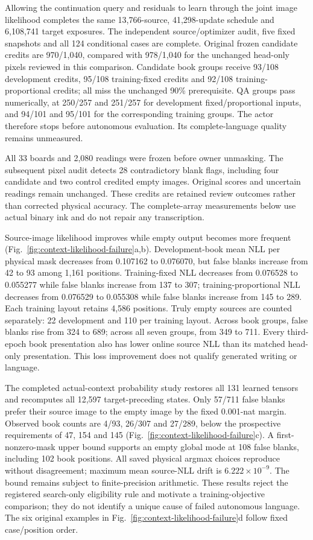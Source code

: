 \documentclass[12pt,a4paper]{article}
\providecommand{\DIFadd}[1]{{\protect\color{blue} \sf #1}} %
\begin{document}
\DIFadd{Allowing the continuation query and residuals to learn through the joint image
likelihood completes the same 13,766-source, 41,298-update schedule and
6,108,741 target exposures. The independent source/optimizer audit, five fixed
snapshots and all 124 conditional cases are complete. Original frozen candidate
credits are 970/1,040, compared with 978/1,040 for the unchanged head-only pixels
reviewed in this comparison. Candidate book groups receive 93/108 development
credits, 95/108 training-fixed credits and 92/108 training-proportional credits;
all miss the unchanged 90\% prerequisite. QA groups pass numerically, at
250/257 and 251/257 for development fixed/proportional inputs, and 94/101 and
95/101 for the corresponding training groups. The actor therefore stops before
autonomous evaluation. Its complete-language quality remains unmeasured.
}

\DIFadd{All 33 boards and 2,080 readings were frozen before owner unmasking. The
subsequent pixel audit detects 28 contradictory blank flags, including four
candidate and two control credited empty images. Original scores and uncertain
readings remain unchanged. These credits are retained review outcomes rather
than corrected physical accuracy. The complete-array measurements below use
actual binary ink and do not repair any transcription.
}

\DIFadd{Source-image likelihood improves while empty output becomes more frequent
(Fig.~\ref{fig:context-likelihood-failure}a,b). Development-book mean NLL per
physical mask decreases from 0.107162 to 0.076070, but false blanks increase
from 42 to 93 among 1,161 positions. Training-fixed NLL decreases from 0.076528
to 0.055277 while false blanks increase from 137 to 307; training-proportional
NLL decreases from 0.076529 to 0.055308 while false blanks increase from 145
to 289. Each training layout retains 4,586 positions. Truly empty sources are
counted separately: 22 development and 110 per training layout. Across book
groups, false blanks rise from 324 to 689; across all seven groups, from 349
to 711. Every third-epoch book presentation also has lower online source NLL
than its matched head-only presentation. This loss improvement does not
qualify generated writing or language.
}

\DIFadd{The completed actual-context probability study restores all 131 learned tensors
and recomputes all 12,597 target-preceding states. Only 57/711 false blanks
prefer their source image to the empty image by the fixed 0.001-nat margin.
Observed book counts are 4/93, 26/307 and 27/289, below the prospective
requirements of 47, 154 and 145 (Fig.~\ref{fig:context-likelihood-failure}c).
A first-nonzero-mask upper bound supports an empty global mode at 108 false
blanks, including 102 book positions. All saved physical argmax choices
reproduce without disagreement; maximum mean source-NLL drift is
$6.222\times10^{-9}$. The bound remains subject to finite-precision arithmetic.
These results reject the registered search-only eligibility rule and motivate
a training-objective comparison; they do not identify a unique cause of failed
autonomous language. The six original examples in
Fig.~\ref{fig:context-likelihood-failure}d follow fixed case/position order.
}
\end{document}

